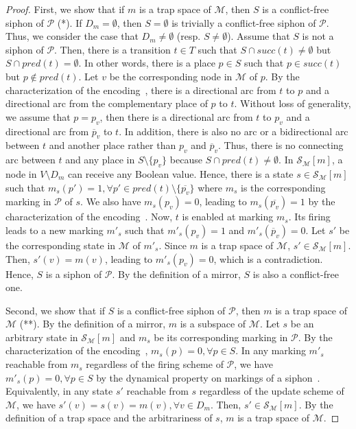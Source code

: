 \documentclass[preprint,12pt]{elsarticle}
\begin{document}
\begin{proof}

  First, we show that if \(m\) is a trap space of \(\mathcal{M}\), then \(S\) is a conflict-free siphon of \(\mathcal{P}\) (*). If \(D_m = \emptyset\), then \(S = \emptyset\) is trivially a conflict-free siphon of \(\mathcal{P}\). Thus, we consider the case that \(D_m \neq \emptyset\) (resp. \(S \neq \emptyset\)). Assume that \(S\) is not a siphon of \(\mathcal{P}\). Then, there is a transition \(t \in T\) such that \(S\cap succ(t)\not =\emptyset\) but \(S\cap pred(t)=\emptyset\). In other words, there is a place \(p \in S\) such that \(p \in succ(t)\) but \(p \not \in pred(t)\). Let \(v\) be the corresponding node in \(\mathcal{M}\) of \(p\). By the characterization of the encoding~\cite{chaouiya2004qualitative}, there is a directional arc from \(t\) to \(p\) and a directional arc from the complementary place of \(p\) to \(t\). Without loss of generality, we assume that \(p = p_v\), then there is a directional arc from \(t\) to \(p_v\) and a directional arc from \(\overline{p}_v\) to \(t\). In addition, there is also no arc or a bidirectional arc between \(t\) and another place rather than \(p_v\) and \(\overline{p}_v\). Thus, there is no connecting arc between \(t\) and any place in \(S \setminus \{p_v\}\) because \(S\cap pred(t)\not =\emptyset\). In \(\mathcal{S}_{\mathcal{M}}[m]\), a node in \(V \setminus D_m\) can receive any Boolean value. Hence, there is a state \(s \in \mathcal{S}_{\mathcal{M}}[m]\) such that \(m_s(p') = 1, \forall p' \in pred(t) \setminus \{\overline{p_v}\}\) where \(m_s\) is the corresponding marking in \(\mathcal{P}\) of \(s\). We also have \(m_s(p_v) = 0\), leading to \(m_s(\overline{p_v}) = 1\) by the characterization of the encoding~\cite{chaouiya2004qualitative}. Now, \(t\) is enabled at marking \(m_s\). Its firing leads to a new marking \(m'_s\) such that \(m'_s(p_v) = 1\) and \(m'_s(\overline{p}_v) = 0\). Let \(s'\) be the corresponding state in \(\mathcal{M}\) of \(m'_s\). Since \(m\) is a trap space of \(\mathcal{M}\), \(s' \in \mathcal{S}_{\mathcal{M}}[m]\). Then, \(s'(v) = m(v)\), leading to \(m'_s(p_v) = 0\), which is a contradiction. Hence, \(S\) is a siphon of \(\mathcal{P}\). By the definition of a mirror, \(S\) is also a conflict-free one.

  Second, we show that if \(S\) is a conflict-free siphon of \(\mathcal{P}\), then \(m\) is a trap space of \(\mathcal{M}\) (**). By the definition of a mirror, \(m\) is a subspace of \(\mathcal{M}\). Let \(s\) be an arbitrary state in \(\mathcal{S}_{\mathcal{M}}[m]\) and \(m_s\) be its corresponding marking in \(\mathcal{P}\). By the characterization of the encoding~\cite{chaouiya2004qualitative}, \(m_s(p) = 0, \forall p \in S\). In any marking \(m'_s\) reachable from \(m_s\) regardless of the firing scheme of \(\mathcal{P}\), we have \(m'_s(p) = 0, \forall p \in S\) by the dynamical property on markings of a siphon~\cite{DBLP:journals/isci/LiuB16}. Equivalently, in any state \(s'\) reachable from \(s\) regardless of the update scheme of \(\mathcal{M}\), we have \(s'(v) = s(v) = m(v), \forall v \in D_m\). Then, \(s' \in \mathcal{S}_{\mathcal{M}}[m]\). By the definition of a trap space and the arbitrariness of \(s\), \(m\) is a trap space of \(\mathcal{M}\).


\end{proof}
\end{document}
